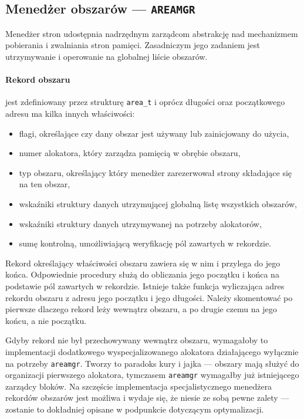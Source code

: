 \documentclass[12pt,a4paper,titlepage,twoside]{mwart}
\begin{document}
\newpage

\subsection{Menedżer obszarów --- \texttt{AREAMGR}}

Menedżer stron udostępnia nadrzędnym zarządcom abstrakcję nad mechanizmem
pobierania i zwalniania stron pamięci. Zasadniczym jego zadaniem jest
utrzymywanie i operowanie na globalnej liście obszarów. 

\paragraph{Rekord obszaru} jest zdefiniowany przez strukturę \verb+area_t+ i
oprócz długości oraz początkowego adresu ma kilka innych właściwości:
\begin{itemize}
\item flagi, określające czy dany obszar jest używany lub zainicjowany do
użycia,
\item numer alokatora, który zarządza pamięcią w obrębie obszaru,
\item typ obszaru, określający który menedżer zarezerwował strony
składające się na ten obszar,
\item wskaźniki struktury danych utrzymującej globalną listę wszystkich obszarów,
\item wskaźniki struktury danych utrzymywanej na potrzeby alokatorów,
\item sumę kontrolną, umożliwiającą weryfikację pól zawartych w rekordzie.
\end{itemize}

Rekord określający właściwości obszaru zawiera się w nim i przylega do jego
końca. Odpowiednie procedury służą do obliczania jego początku i końca na
podstawie pól zawartych w rekordzie. Istnieje także funkcja wyliczająca adres
rekordu obszaru z adresu jego początku i jego długości. Należy skomentować po
pierwsze dlaczego rekord leży wewnątrz obszaru, a po drugie czemu na jego końcu, a
nie początku.

Gdyby rekord nie był przechowywany wewnątrz obszaru, wymagałoby to
implementacji dodatkowego wyspecjalizowanego alokatora działającego wyłącznie
na potrzeby \texttt{areamgr}. Tworzy to paradoks kury i jajka --- obszary mają
służyć do organizacji pierwszego alokatora, tymczasem \texttt{areamgr}
wymagałby już istniejącego zarządcy bloków. Na szczęście implementacja
specjalistycznego menedżera rekordów obszarów jest możliwa i wydaje się, że
niesie ze sobą pewne zalety --- zostanie to dokładniej opisane w podpunkcie
dotyczącym optymalizacji. 
\end{document}
